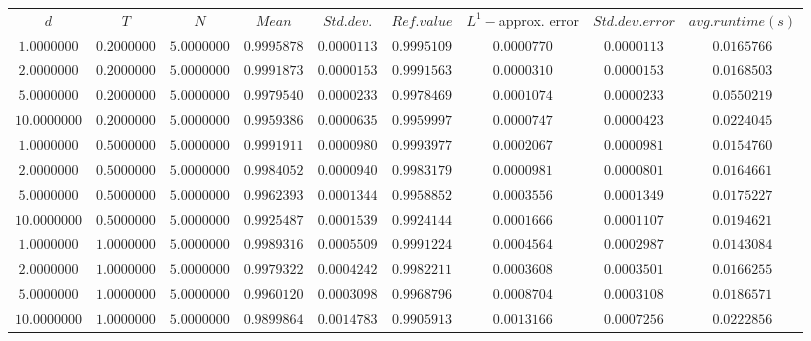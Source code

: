 \begin{tabular}{ccccccccc}
$d$ & $T$ & $N$ & $Mean$ & $Std. dev.$ & $Ref. value$ & $L^1-$approx. error & $Std. dev. error$ & $avg. runtime (s)$\\
$1.0000000$ & $0.2000000$ & $5.0000000$ & $0.9995878$ & $0.0000113$ & $0.9995109$ & $0.0000770$ & $0.0000113$ & $0.0165766$\\
$2.0000000$ & $0.2000000$ & $5.0000000$ & $0.9991873$ & $0.0000153$ & $0.9991563$ & $0.0000310$ & $0.0000153$ & $0.0168503$\\
$5.0000000$ & $0.2000000$ & $5.0000000$ & $0.9979540$ & $0.0000233$ & $0.9978469$ & $0.0001074$ & $0.0000233$ & $0.0550219$\\
$10.0000000$ & $0.2000000$ & $5.0000000$ & $0.9959386$ & $0.0000635$ & $0.9959997$ & $0.0000747$ & $0.0000423$ & $0.0224045$\\
$1.0000000$ & $0.5000000$ & $5.0000000$ & $0.9991911$ & $0.0000980$ & $0.9993977$ & $0.0002067$ & $0.0000981$ & $0.0154760$\\
$2.0000000$ & $0.5000000$ & $5.0000000$ & $0.9984052$ & $0.0000940$ & $0.9983179$ & $0.0000981$ & $0.0000801$ & $0.0164661$\\
$5.0000000$ & $0.5000000$ & $5.0000000$ & $0.9962393$ & $0.0001344$ & $0.9958852$ & $0.0003556$ & $0.0001349$ & $0.0175227$\\
$10.0000000$ & $0.5000000$ & $5.0000000$ & $0.9925487$ & $0.0001539$ & $0.9924144$ & $0.0001666$ & $0.0001107$ & $0.0194621$\\
$1.0000000$ & $1.0000000$ & $5.0000000$ & $0.9989316$ & $0.0005509$ & $0.9991224$ & $0.0004564$ & $0.0002987$ & $0.0143084$\\
$2.0000000$ & $1.0000000$ & $5.0000000$ & $0.9979322$ & $0.0004242$ & $0.9982211$ & $0.0003608$ & $0.0003501$ & $0.0166255$\\
$5.0000000$ & $1.0000000$ & $5.0000000$ & $0.9960120$ & $0.0003098$ & $0.9968796$ & $0.0008704$ & $0.0003108$ & $0.0186571$\\
$10.0000000$ & $1.0000000$ & $5.0000000$ & $0.9899864$ & $0.0014783$ & $0.9905913$ & $0.0013166$ & $0.0007256$ & $0.0222856$\\
\end{tabular}
